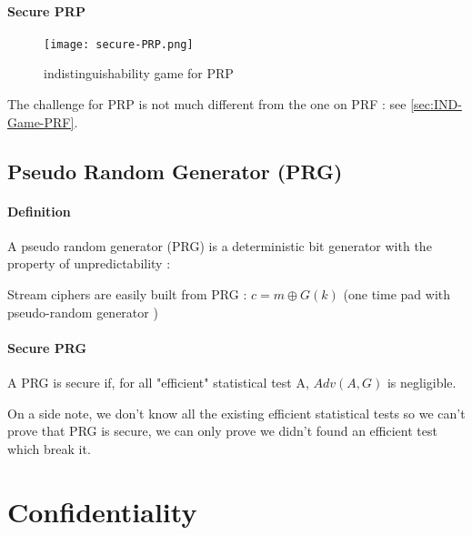 \paragraph{Secure PRP \\}


\begin{figure}[ht!]
	\centering
		\texttt{[image: secure-PRP.png]}
	\caption{indistinguishability game for PRP}
	\label{fig:Cipher}
\end{figure}

The challenge for PRP is not much different from the one on PRF : see \ref{sec:IND-Game-PRF}.

\subsection{Pseudo Random Generator     (PRG)} 


\paragraph{Definition \\}

A pseudo random generator (PRG) is a deterministic bit generator with the property of  unpredictability :

Stream ciphers are easily built from PRG : $c = m \oplus G(k) $  (one time pad with pseudo-random generator )


\paragraph{Secure PRG \\}
A PRG is secure if, for all "efficient" statistical test A, $Adv(A,G)$ is negligible.

On a side note, we don't know all the existing efficient statistical tests so we can't prove that PRG is secure, we can only prove we didn't found an efficient test which break it.


\section{Confidentiality}

